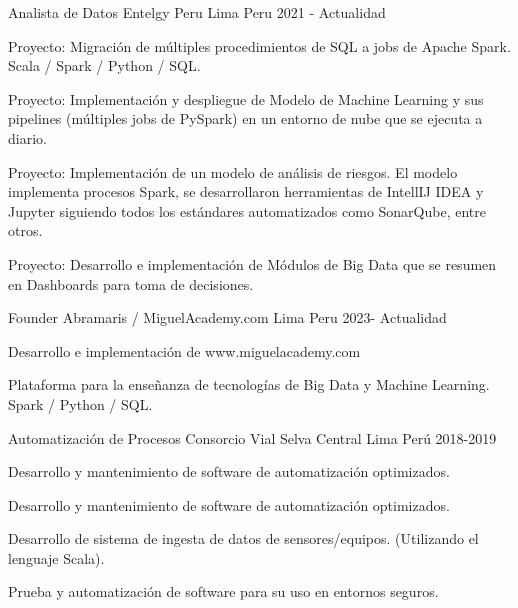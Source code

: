 

\begin{cventries}

  \cventry
    {Analista de Datos} %
    {Entelgy Peru} %
    {Lima Peru} %
    {2021 - Actualidad} %
    {
      \begin{cvitems} %
        \item {Proyecto: Migraci\'on de m\'ultiples procedimientos de SQL a jobs de Apache Spark. Scala / Spark / Python / SQL.}
        \item {Proyecto: Implementaci\'on y despliegue de Modelo de Machine Learning y sus pipelines (m\'ultiples jobs de PySpark) en un entorno de nube que se ejecuta a diario.}
        \item {Proyecto: Implementaci\'on de un modelo de an\'alisis de riesgos. El modelo implementa procesos Spark, se desarrollaron herramientas de IntellIJ IDEA y Jupyter siguiendo todos los est\'andares automatizados como SonarQube, entre otros.}
        \item {Proyecto: Desarrollo e implementaci\'on de M\'odulos de Big Data que se resumen en Dashboards para toma de decisiones.}
      \end{cvitems}
    }

  \cventry
  {Founder} %
  {Abramaris / MiguelAcademy.com} %
  {Lima Peru} %
  {2023- Actualidad} %
  {
    \begin{cvitems} %
      \item {Desarrollo e implementaci\'on de www.miguelacademy.com}
      \item {Plataforma para la enseñanza de tecnolog\'ias de Big Data y Machine Learning. Spark / Python / SQL.}
    \end{cvitems}
  }
  \cventry
  {Automatizaci\'on de Procesos} %
  {Consorcio Vial Selva Central} %
  {Lima Per\'u} %
  {2018-2019} %
  {
    \begin{cvitems} %
      \item {Desarrollo y mantenimiento de software de automatizaci\'on optimizados.}
      \item {Desarrollo y mantenimiento de software de automatizaci\'on optimizados.}
      \item {Desarrollo de sistema de ingesta de datos de sensores/equipos. (Utilizando el lenguaje Scala).}
      \item {Prueba y automatizaci\'on de software para su uso en entornos seguros.}


\end{cvitems}}
\end{cventries}
